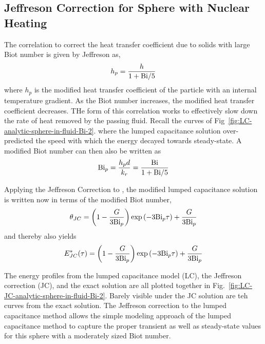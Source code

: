\subsection{Jeffreson Correction for Sphere with Nuclear Heating}
The correlation to correct the heat transfer coefficient due to solids with large Biot number is given by Jeffreson as,\cite{jeffreson409}
\begin{equation}
	h_{p}=\frac{h}{1+\mathrm{Bi}/5}
\end{equation}
where $h_p$ is the modified heat transfer coefficient of the particle with an internal temperature gradient. As the Biot number increases, the modified heat transfer coefficient decreases. THe form of this correlation works to effectively slow down the rate of heat removed by the passing fluid. Recall the curves of Fig~\ref{fig:LC-analytic-sphere-in-fluid-Bi-2}. where the lumped capacitance solution over-predicted the speed with which the energy decayed towards steady-state. A modified Biot number can then also be written as
\begin{equation}\label{eq:jeffreson-correction-bip}
	\mathrm{Bi}_p = \frac{h_p d}{k_r} = \frac{\mathrm{Bi}}{1+\mathrm{Bi}/5}
\end{equation}

Applying the Jeffreson Correction to , the modified lumped capacitance solution is written now in terms of the modified Biot number,
\begin{equation}
\label{eq:theta-jc-bip}
	\theta_{JC}=\left(1-\frac{G}{3\mathrm{Bi}_p}\right)\exp\left(-3\mathrm{Bi}_p \tau\right) + \frac{G}{3\mathrm{Bi}_p}
\end{equation}
and thereby  also yields
\begin{equation}\label{eq:jc-energy-profile}
	E^*_{JC}(\tau) = \left(1-\frac{G}{3\mathrm{Bi}_p}\right)\exp\left(-3\mathrm{Bi}_p \tau\right) + \frac{G}{3\mathrm{Bi}_p}
\end{equation}

The energy profiles from the lumped capacitance model (LC), the Jeffreson correction (JC), and the exact solution are all plotted together in Fig.~\ref{fig:LC-JC-analytic-sphere-in-fluid-Bi-2}. Barely visible under the JC solution are teh curves from the exact solution. The Jeffreson correction to the lumped capacitance method allows the simple modeling approach of the lumped capacitance method to capture the proper transient as well as steady-state values for this sphere with a moderately sized Biot number. 

